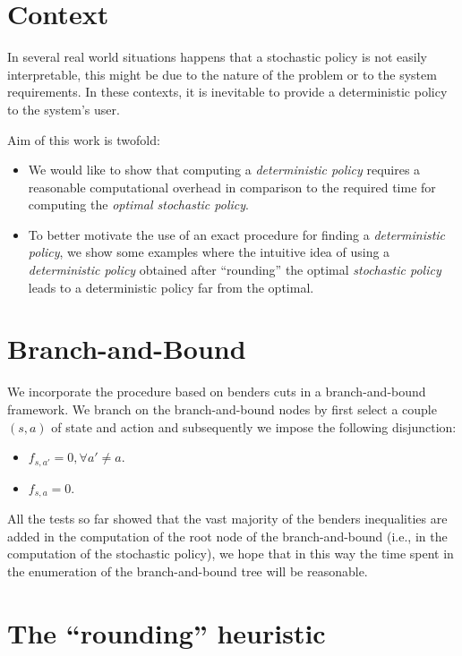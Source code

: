 \documentclass[10pt,a4paper]{article}
\begin{document}
\section{Context}
In several real world situations happens that a stochastic policy is not easily interpretable, this might be due to the nature of the problem or to the system requirements. In these contexts, it is inevitable to provide a deterministic policy to the system's user. 

Aim of this work is twofold:
\begin{itemize}
\item We would like to show that computing a \textit{deterministic policy} requires a reasonable computational overhead in comparison to the required time for computing the \textit{optimal stochastic policy}.
\item To better motivate the use of an exact procedure for finding a \textit{deterministic policy}, we show some examples where the intuitive idea of using a  \textit{deterministic policy} obtained after ``rounding'' the optimal  \textit{stochastic policy} leads to a deterministic policy far from the optimal.   
\end{itemize}

\section{Branch-and-Bound}

We incorporate the procedure based on benders cuts in a branch-and-bound framework. We branch on the branch-and-bound nodes by first select a couple $(s,a)$ of state and action and subsequently we impose the following disjunction:
\begin{itemize}
\item $f_{s,a'}=0, \forall a'\neq a$.
\item $f_{s,a}=0$.
\end{itemize} 
All the tests so far showed that the vast majority of the benders inequalities are added in the computation of the root node of the branch-and-bound (i.e., in the computation of the stochastic policy), we hope that in this way the time spent in the enumeration of the branch-and-bound tree will be reasonable.


\section{The ``rounding'' heuristic}
\end{document}
